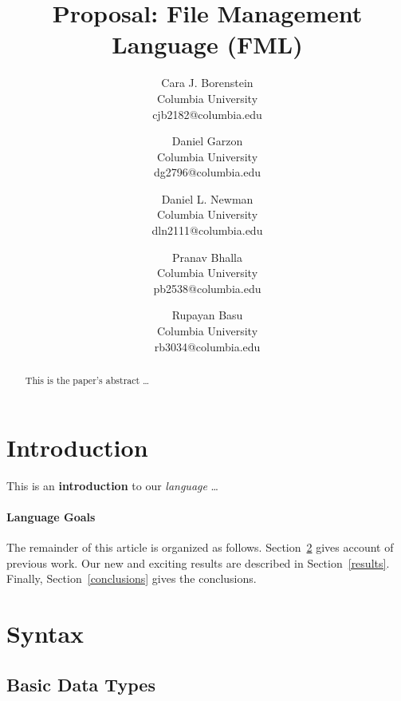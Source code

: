 \documentclass[11pt]{article}
\title{\textbf{\huge Proposal: File Management Language (FML)}}
\author{
  Cara J. Borenstein\\
  Columbia University\\
  cjb2182@columbia.edu
  \and
  Daniel Garzon\\
  Columbia University\\
  dg2796@columbia.edu
  \and
  Daniel L. Newman\\
  Columbia University\\
  dln2111@columbia.edu
  \and
  Pranav Bhalla\\
  Columbia University\\
  pb2538@columbia.edu
  \and
  Rupayan Basu\\
  Columbia University\\
  rb3034@columbia.edu
}
\begin{document}
\maketitle

\begin{abstract}
This is the paper's abstract \ldots
\end{abstract}

\section{Introduction}
This is an \textbf{introduction} to our \emph{language} \ldots

\paragraph{Language Goals}
The remainder of this article is organized as follows.
Section~\ref{previous work} gives account of previous work.
Our new and exciting results are described in Section~\ref{results}.
Finally, Section~\ref{conclusions} gives the conclusions.

\newpage
\section{Syntax}\label{previous work}

\subsection{Basic Data Types}
\end{document}
